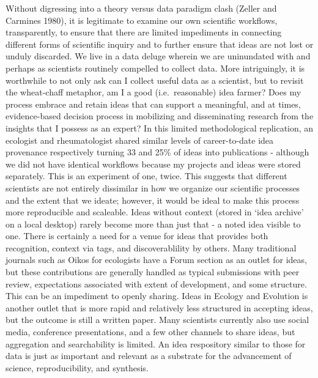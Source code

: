\documentclass[]{elsarticle} %
\begin{document}
Without digressing into a theory versus data paradigm clash (Zeller and
Carmines 1980), it is legitimate to examine our own scientific
workflows, transparently, to ensure that there are limited impediments
in connecting different forms of scientific inquiry and to further
ensure that ideas are not lost or unduly discarded. We live in a data
deluge wherein we are uninundated with and perhaps as scientists
routinely compelled to collect data. More intriguingly, it is worthwhile
to not only ask can I collect useful data as a scientist, but to revisit
the wheat-chaff metaphor, am I a good (i.e.~reasonable) idea farmer?
Does my process embrace and retain ideas that can support a meaningful,
and at times, evidence-based decision process in mobilizing and
disseminating research from the insights that I possess as an expert? In
this limited methodological replication, an ecologist and rheumatologist
shared similar levels of career-to-date idea provenance respectively
turning 33 and 25\% of ideas into publications - although we did not
have identical workflows because my projects and ideas were stored
separately. This is an experiment of one, twice. This suggests that
different scientists are not entirely dissimilar in how we organize our
scientific processes and the extent that we ideate; however, it would be
ideal to make this process more reproducible and scaleable. Ideas
without context (stored in `idea archive' on a local desktop) rarely
become more than just that - a noted idea visible to one. There is
certainly a need for a venue for ideas that provides both recognition,
context via tags, and discoverablility by others. Many traditional
journals such as Oikos for ecologists have a Forum section as an outlet
for ideas, but these contributions are generally handled as typical
submissions with peer review, expectations associated with extent of
development, and some structure. This can be an impediment to openly
sharing. Ideas in Ecology and Evolution is another outlet that is more
rapid and relatively less structured in accepting ideas, but the outcome
is still a written paper. Many scientists currently also use social
media, conference presentations, and a few other channels to share
ideas, but aggregation and searchability is limited. An idea respository
similar to those for data is just as important and relevant as a
substrate for the advancement of science, reproducibility, and
synthesis.
\end{document}
